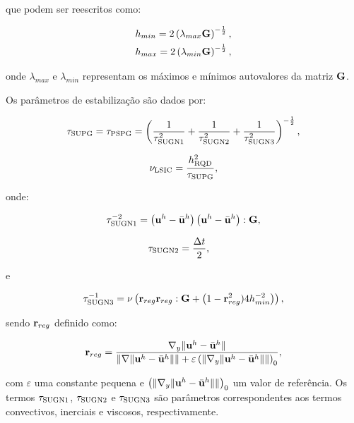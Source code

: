 \documentclass[tese_patricia]{subfiles}%
\begin{document}
\noindent que podem ser reescritos como:

\begin{align}
	h_{min} = 2\left(\lambda_{max}\mathbf{G}\right)^{-\frac{1}{2}}, \\
	h_{max} = 2\left(\lambda_{min}\mathbf{G}\right)^{-\frac{1}{2}},
\end{align}

\noindent onde $\lambda_{max}$ e $\lambda_{min}$ representam os máximos e mínimos autovalores da matriz $\mathbf{G}$. 

Os parâmetros de estabilização são dados por:

\begin{align}
	\tau_{\mathrm{SUPG}} = \tau_{\mathrm{PSPG}} =\left(\frac{1}{\tau_{\mathrm{SUGN1}}^2} + \frac{1}{\tau_{\mathrm{SUGN2}}^2} + \frac{1}{\tau_{\mathrm{SUGN3}}^2} \right)^{-\frac{1}{2}},
\end{align}

\begin{align}
	\nu_{\mathrm{LSIC}} = \frac{h_{\mathrm{RQD}}^2}{\tau_{\mathrm{SUPG}}},
\end{align}

\noindent onde:

\begin{align}
	\tau_{\mathrm{SUGN1}}^{-2} = \left(\mathbf{u}^h - \bar{\mathbf{u}}^h \right) \left(\mathbf{u}^h - \bar{\mathbf{u}}^h \right) : \mathbf{G} ,
\end{align}

\begin{align}
	\tau_{\mathrm{SUGN2}}&=\frac{\Delta t}{2},
\end{align}

\noindent e

\begin{align}
	\tau_{\mathrm{SUGN3}}^{-1} = \nu \left(\mathbf{r}_{reg}\mathbf{r}_{reg} : \mathbf{G} + \left(1 - \mathbf{r}_{reg}^2)4h_{min}^{-2} \right)\right) ,
\end{align}

\noindent sendo $\mathbf{r}_{reg}$ definido como:

\begin{align}
	\mathbf{r}_{reg} =\frac{\nabla_y \lVert\mathbf{u}^h - \bar{\mathbf{u}}^h\rVert}{\lVert \nabla \lVert\mathbf{u}^h - \bar{\mathbf{u}}^h\rVert\rVert + \varepsilon\left(\lVert \nabla_y \lVert\mathbf{u}^h - \bar{\mathbf{u}}^h\rVert\rVert\right)_0},
\end{align}

\noindent com $\varepsilon$ uma constante pequena e $\left(\lVert \nabla_y \lVert\mathbf{u}^h- \bar{\mathbf{u}}^h\rVert\rVert\right)_0$ um valor de referência. Os termos $\tau_{\mathrm{SUGN1}}$, $\tau_{\mathrm{SUGN2}}$ e $\tau_{\mathrm{SUGN3}}$ são parâmetros correspondentes aos termos convectivos, inerciais e viscosos, respectivamente.
\end{document}
